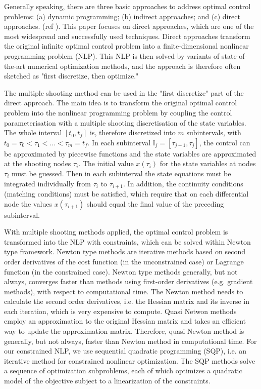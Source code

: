 \documentclass  [
  paper    = a4,
  BCOR     = 10mm,
  twoside,
  fontsize = 12pt,
  fleqn,
  toc      = bibnumbered,
  toc      = listofnumbered,
  numbers  = noendperiod,
  headings = normal,
  listof   = leveldown,
  version  = 3.03
]                                       {scrreprt}
\newcommand{\<}{\langle}
\renewcommand{\>}{\rangle}
\begin{document}
Generally speaking, there are three basic approaches to address optimal control problems: (a) dynamic programming; (b) indirect approaches; and (c) direct approaches. (ref \cite{MHHP05}). This paper focuses on direct approaches, which are one of the most widespread and successfully used techniques. Direct approaches transform the original infinite optimal control problem into a finite-dimensional nonlinear programming problem (NLP). This NLP is then solved by variants of state-of-the-art numerical optimization methods, and the approach is therefore often sketched as "first discretize, then optimize."

The multiple shooting method can be used in the "first discretize" part of the direct approach. The main idea is to transform the original optimal control problem into the nonlinear programming problem by coupling the control parameterisation with a multiple shooting discretisation of the state variables. The whole interval $[t_0, t_f]$ is, therefore discretized into $m$ subintervals, with $t_0 = \tau_0 < \tau_1 < ... < \tau_m = t_f$. In each subinterval $\mathbb{I}_j = [\tau_{j-1}, \tau_j]$, the control can be approximated by piecewise functions and the state variables are approximated at the shooting nodes $\tau_i$. The initial value $x(\tau_i)$ for the state variables at nodes $\tau_i$ must be guessed. Then in each subinterval the state equations must be integrated individually from $\tau_i$ to $\tau_{i+1}$. In addition, the continuity conditions (matching conditions) must be satisfied, which require that on each differential node the values $x(\tau_{i+1})$ should equal the final value of the preceding subinterval.

With multiple shooting methods applied, the optimal control problem is transformed into the NLP with constraints, which can be solved within Newton type framework. Newton type methods are iterative methods based on second order derivatives of the cost function (in the unconstrained case) or Lagrange function (in the constrained case). Newton type methods generally, but not always, converges faster than methods using first-order derivatives (e.g. gradient methods), with respect to computational time. The Newton method needs to calculate the second order derivatives, i.e. the Hessian matrix and its inverse in each iteration, which is very expensive to compute. Quasi Netwon methods employ an approximation to the original Hessian matrix and takes an efficient way to update the approximation matrix. Therefore, quasi Newton method is generally, but not always, faster than Newton method in computational time. For our constrained NLP, we use sequential quadratic programming (SQP), i.e. an iterative method for constrained nonlinear optimization. The SQP methods solve a sequence of optimization subproblems, each of which optimizes a quadratic model of the objective subject to a linearization of the constraints.
\end{document}
